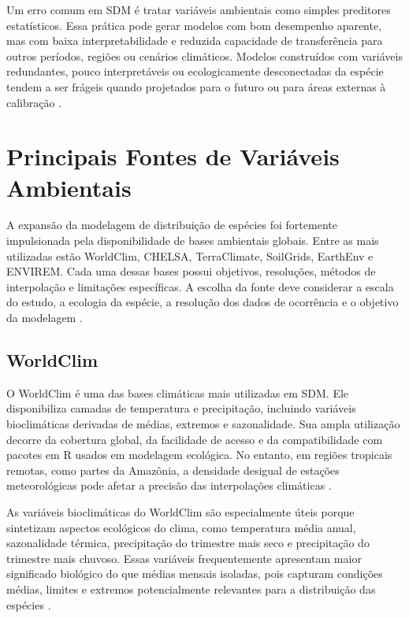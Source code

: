 Um erro comum em SDM é tratar variáveis ambientais como simples preditores estatísticos. Essa prática pode gerar modelos com bom desempenho aparente, mas com baixa interpretabilidade e reduzida capacidade de transferência para outros períodos, regiões ou cenários climáticos. Modelos construídos com variáveis redundantes, pouco interpretáveis ou ecologicamente desconectadas da espécie tendem a ser frágeis quando projetados para o futuro ou para áreas externas à calibração \parencite{araujo2005validation,thuiller2004effects}.

\section{Principais Fontes de Variáveis Ambientais}

A expansão da modelagem de distribuição de espécies foi fortemente impulsionada pela disponibilidade de bases ambientais globais. Entre as mais utilizadas estão WorldClim, CHELSA, TerraClimate, SoilGrids, EarthEnv e ENVIREM. Cada uma dessas bases possui objetivos, resoluções, métodos de interpolação e limitações específicas. A escolha da fonte deve considerar a escala do estudo, a ecologia da espécie, a resolução dos dados de ocorrência e o objetivo da modelagem \parencite{franklin2010mapping,guisan2017habitat}.

\subsection{WorldClim}

O WorldClim é uma das bases climáticas mais utilizadas em SDM. Ele disponibiliza camadas de temperatura e precipitação, incluindo variáveis bioclimáticas derivadas de médias, extremos e sazonalidade. Sua ampla utilização decorre da cobertura global, da facilidade de acesso e da compatibilidade com pacotes em R usados em modelagem ecológica. No entanto, em regiões tropicais remotas, como partes da Amazônia, a densidade desigual de estações meteorológicas pode afetar a precisão das interpolações climáticas \parencite{fick2017worldclim,booth2014bioclim}.

As variáveis bioclimáticas do WorldClim são especialmente úteis porque sintetizam aspectos ecológicos do clima, como temperatura média anual, sazonalidade térmica, precipitação do trimestre mais seco e precipitação do trimestre mais chuvoso. Essas variáveis frequentemente apresentam maior significado biológico do que médias mensais isoladas, pois capturam condições médias, limites e extremos potencialmente relevantes para a distribuição das espécies \parencite{booth2014bioclim,guisan2017habitat}.

